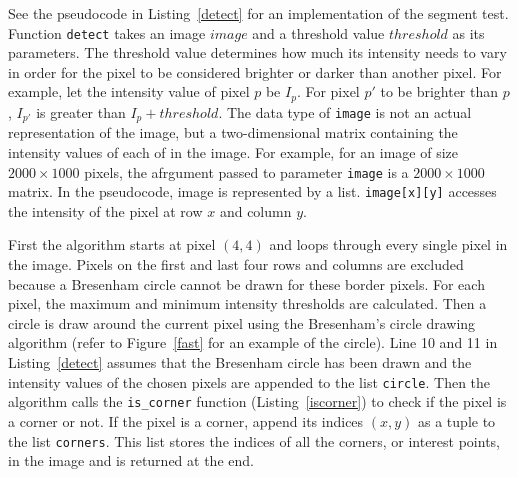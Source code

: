 See the pseudocode in Listing~\ref{detect} for an implementation of the segment test. Function \texttt{detect} takes an image $image$ and a threshold value $threshold$ as its parameters. The threshold value determines how much its intensity needs to vary in order for the pixel to be considered brighter or darker than another pixel. For example, let the intensity value of pixel $p$ be $I_p$. For pixel $p'$ to be brighter than $p$, $I_{p'}$ is greater than $I_p + threshold$. The data type of \texttt{image} is not an actual representation of the image, but a two-dimensional matrix containing the intensity values of each of in the image. For example, for an image of size $2000 \times 1000$ pixels, the afrgument passed to parameter \texttt{image} is a $2000 \times 1000$ matrix. In the pseudocode, image is represented by a list. \texttt{image[x][y]} accesses the intensity of the pixel at row $x$ and column $y$.

First the algorithm starts at pixel $(4,4)$ and loops through every single pixel in the image. Pixels on the first and last four rows and columns are excluded because a Bresenham circle cannot be drawn for these border pixels. For each pixel, the maximum and minimum intensity thresholds are calculated. Then a circle is draw around the current pixel using the Bresenham's circle drawing algorithm (refer to Figure~\ref{fast} for an example of the circle). Line 10 and 11 in Listing~\ref{detect} assumes that the Bresenham circle has been drawn and the intensity values of the chosen pixels are appended to the list \texttt{circle}. Then the algorithm calls the \texttt{is\_corner} function (Listing~\ref{iscorner}) to check if the pixel is a corner or not. If the pixel is a corner, append its indices $(x, y)$ as a tuple to the list \texttt{corners}. This list stores the indices of all the corners, or interest points, in the image and is returned at the end.

